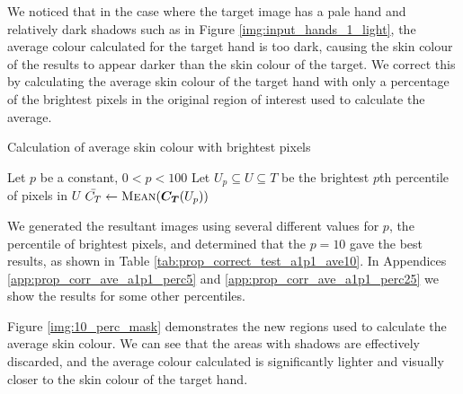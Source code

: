 We noticed that in the case where the target image has a pale hand and relatively dark shadows such as in Figure \ref{img:input_hands_1_light}, the average colour calculated for the target hand is too dark, causing the skin colour of the results to appear darker than the skin colour of the target. We correct this by calculating the average skin colour of the target hand with only a percentage of the brightest pixels in the original region of interest used to calculate the average. 


\begin{algorithm}[H]
\caption{Calculation of average skin colour with brightest pixels}
\label{eq:prop_corr_ave_algo}
\begin{algorithmic}
\State Let $p$ be a constant, $0 < p  < 100$
\State Let $U_p \subseteq U \subseteq T$ be the brightest $p$th percentile of pixels in $U$
\State $\mean{C_T} \gets \Call{Mean}{\vect{C_T}(U_p)}$
\end{algorithmic}
\end{algorithm}

We generated the resultant images using several different values for $p$, the percentile of brightest pixels, and determined that the $p = 10$ gave the best results, as shown in Table \ref{tab:prop_correct_test_a1p1_ave10}. In Appendices \ref{app:prop_corr_ave_a1p1_perc5} and \ref{app:prop_corr_ave_a1p1_perc25} we show the results for some other percentiles.



Figure \ref{img:10_perc_mask} demonstrates the new regions used to calculate the average skin colour. We can see that the areas with shadows are effectively discarded, and the average colour calculated is significantly lighter and visually closer to the skin colour of the target hand. 

